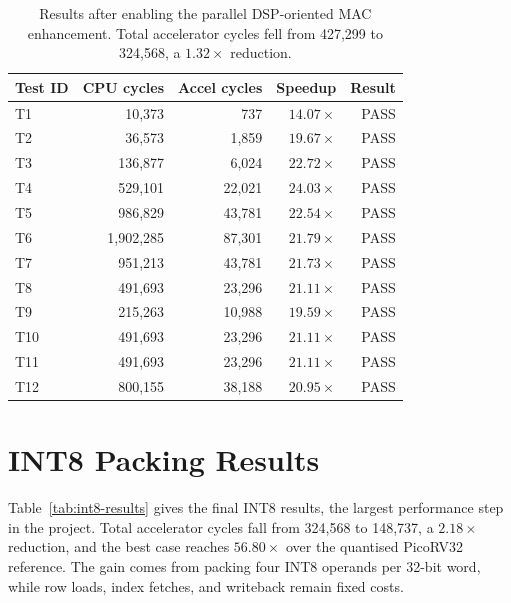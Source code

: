 \begin{table}[htbp]
  \centering
  \small
  \setlength{\tabcolsep}{17pt} %
  \begin{tabular}{lrrrr}
  \toprule
  Test ID & CPU cycles & Accel cycles & Speedup & Result \\
  \midrule
  T1  & 10,373   &    737 & $14.07\times$ & PASS \\
  T2  & 36,573   &  1,859 & $19.67\times$ & PASS \\
  T3  & 136,877  &  6,024 & $22.72\times$ & PASS \\
  T4  & 529,101  & 22,021 & $24.03\times$ & PASS \\
  T5  & 986,829  & 43,781 & $22.54\times$ & PASS \\
  T6  & 1,902,285 & 87,301 & $21.79\times$ & PASS \\
  T7  & 951,213  & 43,781 & $21.73\times$ & PASS \\
  T8  & 491,693  & 23,296 & $21.11\times$ & PASS \\
  T9  & 215,263  & 10,988 & $19.59\times$ & PASS \\
  T10 & 491,693  & 23,296 & $21.11\times$ & PASS \\
  T11 & 491,693  & 23,296 & $21.11\times$ & PASS \\
  T12 & 800,155  & 38,188 & $20.95\times$ & PASS \\
  \bottomrule
  \end{tabular}
  \caption{Results after enabling the parallel DSP-oriented MAC
           enhancement. Total accelerator cycles fell from 427,299 to
           324,568, a $1.32\times$ reduction.}
  \label{tab:dsp-results}
\end{table}

\vspace{2cm}

\section{INT8 Packing Results}

Table~\ref{tab:int8-results} gives the final INT8 results, the largest
performance step in the project. Total accelerator cycles fall from
324,568 to 148,737, a $2.18\times$ reduction, and the best case reaches
$56.80\times$ over the quantised PicoRV32 reference. The gain comes from
packing four INT8 operands per 32-bit word, while row loads, index
fetches, and writeback remain fixed costs.


